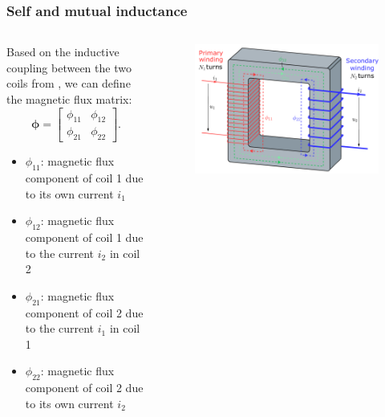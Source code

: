 \begin{frame}
	\frametitle{Self and mutual inductance}
    \begin{columns}
		\begin{column}{0.45\textwidth}
            Based on the inductive coupling between the two coils from , we can define the magnetic flux matrix:
            \begin{equation}
                \bm{\phi} = \begin{bmatrix} \phi_{11} & \phi_{12} \\ \phi_{21} & \phi_{22} \end{bmatrix} .
                \label{eq:flux_matrix_transformer}
            \end{equation}
            \vspace{-0.2cm}
			\begin{itemize}
                \item<2-> $\phi_{11}$: magnetic flux component of coil 1 due to its own current $i_1$
                \item<3-> $\phi_{12}$: magnetic flux component of coil 1 due to the current $i_2$ in coil 2
                \item<4-> $\phi_{21}$: magnetic flux component of coil 2 due to the current $i_1$ in coil 1
                \item<5-> $\phi_{22}$: magnetic flux component of coil 2 due to its own current $i_2$
            \end{itemize}
		\end{column}
        \hfill
		\begin{column}{0.525\textwidth}
			\begin{figure}
				\centering
				\includegraphics[height=0.575\textheight]{fig/lec02/Transformer3d_col3.pdf}

\end{figure}
\end{column}
\end{columns}
\end{frame}
